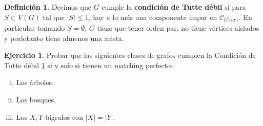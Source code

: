 \documentclass[12pt]{report}
\theoremstyle{plain}
\theoremstyle{definition}
\newtheorem{definition}[theorem]{Definición}
\newtheorem{exercise}[theorem]{Ejercicio}
\newcommand{\abs}[1]{\left \vert #1 \right \vert}
\begin{document}
\bigskip

\begin{definition}\label{def:condicion de Tutte debil}
Decimos que $G$ cumple la \textbf{condición de Tutte débil} si para $S \subset V(G)$ tal que $\abs S \leq 1$, hay a lo más una componente impar en $\mathcal C _{G \setminus \{x\}}$. En particular tomando $S = \emptyset$, $G$ tiene que tener orden par, no tiene vértices aislados y porlotanto tiene almenos una arista.
\end{definition}

\begin{exercise}
Probar que las siguientes clases de grafos cumplen la Condición de Tutte débil \ref{def:condicion de Tutte debil} si y solo si tienen un matching perfecto:
\begin{enumerate}[(i)]
\item Los árboles.
\item Los bosques.
\item Los $X,Y$-bigrafos con $\abs X = \abs Y$.
\end{enumerate}
\end{exercise}
\end{document}
